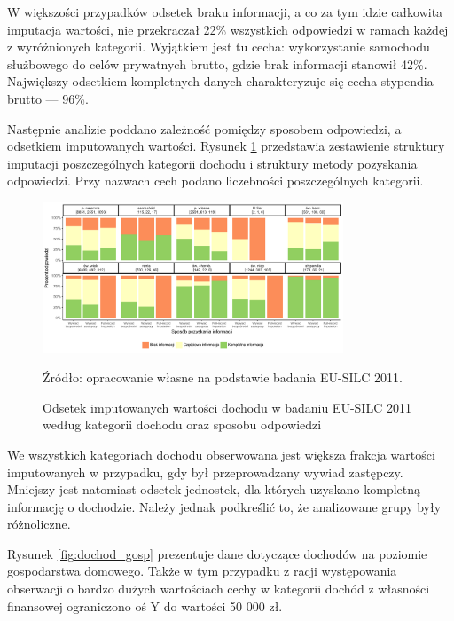 W większości przypadków odsetek braku informacji, a co za tym idzie całkowita imputacja wartości, nie przekraczał 22\% wszystkich odpowiedzi w ramach każdej z wyróżnionych kategorii. Wyjątkiem jest tu cecha: wykorzystanie samochodu służbowego do celów prywatnych brutto, gdzie brak informacji stanowił 42\%. Największy odsetkiem kompletnych danych charakteryzuje się cecha stypendia brutto --- 96\%.	

Następnie analizie poddano zależność pomiędzy sposobem odpowiedzi, a odsetkiem imputowanych wartości. Rysunek \ref{fig:dochod_osoby_imp_prox} przedstawia zestawienie struktury imputacji poszczególnych kategorii dochodu i struktury metody pozyskania odpowiedzi. Przy nazwach cech podano liczebności poszczególnych kategorii.

\begin{figure}[ht]
\centering
\includegraphics[width=0.8\textwidth]{04_wykresy/dochod_osoby_imputacja_proxy-1.pdf}
\caption{Odsetek imputowanych wartości dochodu w badaniu EU-SILC 2011 według kategorii dochodu oraz sposobu odpowiedzi}
\small{Źródło: opracowanie własne na podstawie badania EU-SILC 2011.}
\label{fig:dochod_osoby_imp_prox}
\end{figure}

We wszystkich kategoriach dochodu obserwowana jest większa frakcja wartości imputowanych w przypadku, gdy był przeprowadzany wywiad zastępczy. Mniejszy jest natomiast odsetek jednostek, dla których uzyskano kompletną informację o dochodzie. Należy jednak podkreślić to, że analizowane grupy były różnoliczne.

Rysunek \ref{fig:dochod_gosp} prezentuje dane dotyczące dochodów na poziomie gospodarstwa domowego. Także w tym przypadku z racji występowania obserwacji o bardzo dużych wartościach cechy w kategorii dochód z własności finansowej ograniczono oś Y do wartości 50 000 zł.

